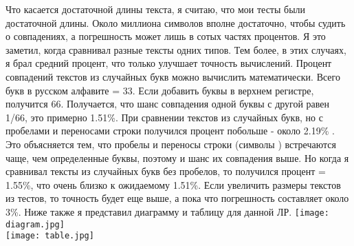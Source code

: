 \documentclass[12pt]{article}
\begin{document}
\par Что касается достаточной длины текста, я считаю, что мои тесты были достаточной длины. Около миллиона символов вполне достаточно, чтобы судить о совпадениях, а погрешность может лишь в сотых частях процентов. Я это заметил, когда сравнивал разные тексты одних типов. Тем более, в этих случаях, я брал средний процент, что только улучшает точность вычислений. Процент совпадений текстов из случайных букв можно вычислить математически. Всего букв в русском алфавите = 33. Если добавить буквы в верхнем регистре, получится 66. Получается, что шанс совпадения одной буквы с другой равен 1/66, это примерно 1.51\%. При сравнении текстов из случайных букв, но с пробелами и переносами строки получился процент побольше - около 2.19\% . Это объясняется тем, что пробелы и переносы строки (символы ) встречаются чаще, чем определенные буквы, поэтому и шанс их совпадения выше. Но когда я сравнивал тексты из случайных букв без пробелов, то получился процент = 1.55\%, что очень близко к ожидаемому 1.51\%. Если увеличить размеры текстов из тестов, то точность будет еще выше, а пока что погрешность составляет около 3\%. Ниже также я представил диаграмму и таблицу для данной ЛР.
\newline
\newline
\texttt{[image: diagram.jpg]}\\
\texttt{[image: table.jpg]}\\
\end{document}

